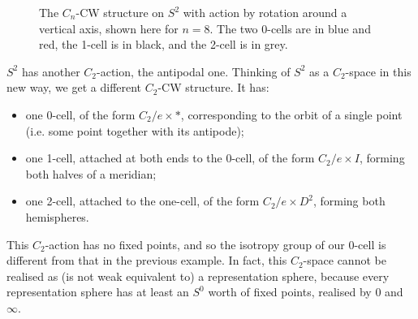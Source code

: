 \begin{figure}
    \centering
      \caption{The $C_n$-CW structure on $S^2$ with action by rotation around a vertical axis, shown here for $n = 8$. The two 0-cells are in blue and red, the 1-cell is in black, and the 2-cell is in grey.}
      \label{fig: rep sphere cyclic rotation}
\end{figure}

\begin{example}
    $S^2$ has another $C_2$-action, the antipodal one. Thinking of $S^2$ as a $C_2$-space in this new way, we get a different $C_2$-CW structure. It has:
    \begin{itemize}
        \item one 0-cell, of the form $C_2/e \times *$, corresponding to the orbit of a single point (i.e. some point together with its antipode);
        \item one 1-cell, attached at both ends to the 0-cell, of the form $C_2/e \times I$, forming both halves of a meridian;
        \item one 2-cell, attached to the one-cell, of the form $C_2/e \times D^2$, forming both hemispheres.
      \end{itemize}
      This $C_2$-action has no fixed points, and so the isotropy group of our 0-cell is different from that in the previous example. In fact, this $C_2$-space cannot be realised as (is not weak equivalent to) a representation sphere, because every representation sphere has at least an $S^0$ worth of fixed points, realised by $0$ and $\infty$.
\end{example}

